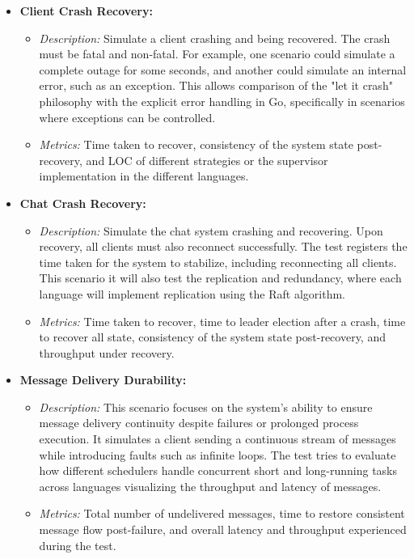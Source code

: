 \begin{itemize}
    \item \textbf{Client Crash Recovery:}
    \begin{itemize}
        \item \textit{Description:} Simulate a client crashing and being recovered. The crash must be fatal and non-fatal. For example, one scenario could simulate a complete outage for some seconds, and another could simulate an internal error, such as an exception. This allows comparison of the "let it crash" philosophy with the explicit error handling in Go, specifically in scenarios where exceptions can be controlled.
        \item \textit{Metrics:} Time taken to recover, consistency of the system state post-recovery, and \gls{LOC} of different strategies or the supervisor implementation in the different languages.
    \end{itemize}
    
    \item \textbf{Chat Crash Recovery:}
    \begin{itemize}
        \item \textit{Description:} Simulate the chat system crashing and recovering. Upon recovery, all clients must also reconnect successfully. The test registers the time taken for the system to stabilize, including reconnecting all clients. This scenario it will also test the replication and redundancy, where each language will implement replication using the Raft algorithm.
        \item \textit{Metrics:} Time taken to recover, time to leader election after a crash, time to recover all state, consistency of the system state post-recovery, and throughput under recovery.
    \end{itemize}
    
        \item \textbf{Message Delivery Durability:}
        \begin{itemize}
        \item \textit{Description:} This scenario focuses on the system's ability to ensure message delivery continuity despite failures or prolonged process execution. It simulates a client sending a continuous stream of messages while introducing faults such as infinite loops. The test tries to evaluate how different schedulers handle concurrent short and long-running tasks across languages visualizing the throughput and latency of messages.
        \item \textit{Metrics:} Total number of undelivered messages, time to restore consistent message flow post-failure, and overall latency and throughput experienced during the test.
    \end{itemize}
    

\end{itemize}
